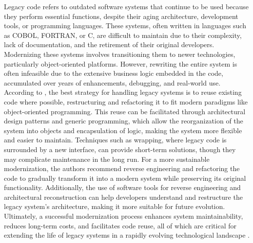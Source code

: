 Legacy code refers to outdated software systems that continue to be used because they perform essential functions, despite their aging architecture, development tools, or programming languages.
These systems, often written in languages such as COBOL, FORTRAN, or C, are difficult to maintain due to their complexity, lack of documentation, and the retirement of their original developers.
Modernizing these systems involves transitioning them to newer technologies, particularly object-oriented platforms.
However, rewriting the entire system is often infeasible due to the extensive business logic embedded in the code, accumulated over years of enhancements, debugging, and real-world use.
According to \citet{jhaReusingCodeModernization2005}, the best strategy for handling legacy systems is to reuse existing code where possible, restructuring and refactoring it to fit modern paradigms like object-oriented programming.
This reuse can be facilitated through architectural design patterns and generic programming, which allow the reorganization of the system into objects and encapsulation of logic, making the system more flexible and easier to maintain.
Techniques such as wrapping, where legacy code is surrounded by a new interface, can provide short-term solutions, though they may complicate maintenance in the long run.
For a more sustainable modernization, the authors recommend reverse engineering and refactoring the code to gradually transform it into a modern system while preserving its original functionality.
Additionally, the use of software tools for reverse engineering and architectural reconstruction can help developers understand and restructure the legacy system's architecture, making it more suitable for future evolution.
Ultimately, a successful modernization process enhances system maintainability, reduces long-term costs, and facilitates code reuse, all of which are critical for extending the life of legacy systems in a rapidly evolving technological landscape \citep{jhaReusingCodeModernization2005}.

